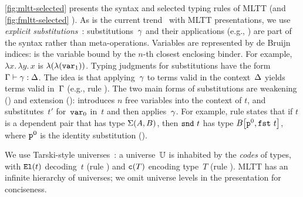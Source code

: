 





\cref{fig:mltt-selected} presents the syntax and selected typing rules of MLTT
(and \cref{fig:fmltt-selected} \TT).
%
As is the current trend~\cite{gratzer-sterling-birkedal-2019,altkap2016,coquand2018canonicity} with MLTT presentations, we use \emph{explicit substitutions}~\cite{substcalculus,abadi1989subst}:
substitutions~$\gamma$ and their applications (e.g., ) are part
of the syntax rather than meta-operations.
%
Variables are represented by de Bruijn indices:
 is the variable bound by the $n$-th closest enclosing binder.
For example, $\lambda x.\,\lambda y.\,x$ is $\lambda({\lambda({\texttt{var}_{1}})})$.
%
Typing judgments for substitutions have the form 
$ {\Gamma} \vdash {\ensuremath{\gamma}} : {\Delta} $.
The idea is that applying~$\gamma$ to terms valid in the context~$\Delta$
yields terms valid in~$\Gamma$ (e.g., rule ).
%
The two main forms of substitutions are weakening () and extension ():
 introduces $n$ free variables into the context of $t$, and
 substitutes~$t'$ for~$\texttt{var}_{0}$ in~$t$ and
then applies~$\gamma$.
For example, rule  states that if $t$ is a dependent pair
that has type $\Sigma({A},{B})$, then $\texttt{snd}~{t}$ has type
${B}\!\left[{{\texttt{p}^{0}},{\texttt{fst}~{t}}}\right]$,
where $\texttt{p}^{0}$ is the identity substitution ().

We use Tarski-style universes~\cite{hofmann1997syntax}: a universe~$\mathbb{U}$
is inhabited by the \emph{codes} of types,
with $\texttt{El}({t})$ decoding~$t$ (rule )
and $\texttt{c}({T})$ encoding type~$T$ (rule ).
MLTT has an infinite hierarchy of universes;
we omit universe levels in the presentation for conciseness.

